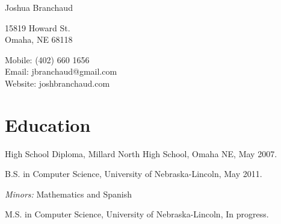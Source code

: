 \documentclass[10pt,letterpaper]{article}
\def\name{Joshua Branchaud}
\renewenvironment{itemize}{
  \begin{list}{}{
    \setlength{\leftmargin}{1.5em}
    \setlength{\itemsep}{0.25em}
    \setlength{\parskip}{0pt}
    \setlength{\parsep}{0.25em}
  }
}{
  \end{list}
}
\begin{document}
{\huge \name}


\vspace{0.25in}

\begin{minipage}[t]{0.5\textwidth}
  15819 Howard St. \\
  Omaha, NE 68118
\end{minipage}
\begin{minipage}[t]{0.5\textwidth}
  Mobile: (402) 660 1656 \\
  Email: jbranchaud@gmail.com \\
  Website: joshbranchaud.com \\
\end{minipage}


%

\section*{Education}

\begin{itemize}
  \item High School Diploma, Millard North High School, Omaha NE, May 2007.

  \item B.S. in Computer Science, University of Nebraska-Lincoln, May 2011.

    \begin{itemize}
        \item \textit{Minors:} Mathematics and Spanish
    \end{itemize}
    
    \item M.S. in Computer Science, University of Nebraska-Lincoln, In
    progress.

\end{itemize}
\end{document}
